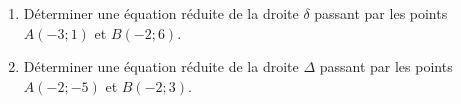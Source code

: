 
\begin{enumerate}
\item Déterminer une équation réduite de la droite $\delta$ passant par les points $A(-3;1)$ et $B(-2;6)$. 
\item Déterminer une équation réduite de la droite $\Delta$ passant par les points $A(-2;-5)$ et $B(-2;3)$.
\end{enumerate}